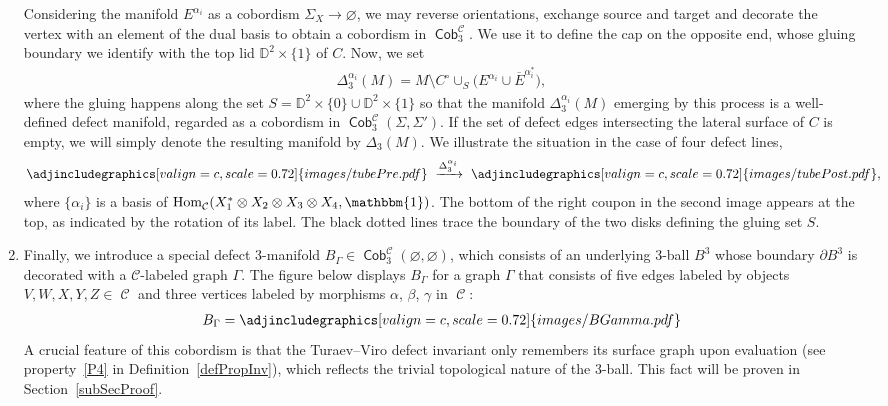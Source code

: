 \documentclass[10pt,a4paper]{amsart}
\DeclareMathOperator{\Hom}{Hom}
\DeclareMathOperator{\Cob}{\mathsf{Cob}}
\DeclareMathOperator{\calc}{\mathcal{C}}
\numberwithin{equation}{section}
\theoremstyle{definition}
\begin{document}
\begin{enumerate}
 Considering the manifold $E^{\alpha_i}$ as a cobordism $\Sigma_X \rightarrow \varnothing $, we may reverse orientations, exchange source and target and decorate the vertex with an element of the dual basis \smash{$\{\alpha_i^*\} \subset \Hom_{\mathcal{C}}\bigl(\mathbbm{1}, X_1^{\varepsilon(1)} \otimes \dots \otimes X_n^{\varepsilon(n)}\bigr)$} to obtain a cobordism  in $\Cob_3^{\calc}$. We use it to define the cap on the opposite end, whose gluing boundary we identify with the top lid $\mathbb{D}^2 \times \{1\}$ of $C$. Now, we set
 \begin{align}
 \label{eqMovTube}
 \Delta_3^{\alpha_i}(M) = M \setminus C^{\circ} \cup_S \bigl(E^{\alpha_i} \cup \overline{E}^{\alpha_i^*}\bigr),
 \end{align}
 where the gluing happens along the set $S = \mathbb{D}^2 \times \{0\} \cup \mathbb{D}^2 \times \{1\}$ so that the manifold $\Delta_3^{\alpha_i}(M)$ emerging by this process is a well-defined defect manifold, regarded as a cobordism in $\Cob_3^{\calc}(\Sigma, \Sigma')$. If the set of defect edges intersecting the lateral surface of $C$ is empty, we will simply denote the resulting manifold by $\Delta_3(M)$. We illustrate the situation in the case of four defect lines,
 \begin{align*}
 \adjincludegraphics[valign=c, scale = 0.72]{images/tubePre.pdf} \,\, \xrightarrow{\Delta_3^{\alpha_i}} \,\, \adjincludegraphics[valign=c, scale = 0.72]{images/tubePost.pdf},
 \end{align*}
 where $\{\alpha_i\}$ is a basis of $\Hom_{\calc}(X_1^* \otimes X_2 \otimes X_3 \otimes X_4, \mathbbm{1})$. The bottom of the right coupon in the second image appears at the top, as indicated by the rotation of its label. The black dotted lines trace the boundary of the two disks defining the gluing set $S$.
 \item Finally, we introduce a special defect 3-manifold $B_{\Gamma} \in \Cob_3^{\calc}(\varnothing, \varnothing)$, which consists of an underlying 3-ball $B^3$ whose boundary $\partial B^3$ is decorated with a $\mathcal{C}$-labeled graph $\Gamma$. The figure below displays $B_{\Gamma}$ for a graph $\Gamma$ that consists of five edges labeled by objects $V, W, X, Y, Z \in \calc$ and three vertices labeled by morphisms $\alpha$, $\beta$, $\gamma$ in $\calc$:
 \begin{align} \label{eqBGamma}
 B_{\Gamma} = \adjincludegraphics[valign=c, scale = 0.72]{images/BGamma.pdf}
 \end{align}
 A crucial feature of this cobordism is that the Turaev--Viro defect invariant only remembers its surface graph upon evaluation (see property~\ref{P4} in Definition~\ref{defPropInv}), which reflects the trivial topological nature of the 3-ball. This fact will be proven in Section~\ref{subSecProof}.
\end{enumerate}
\end{document}
